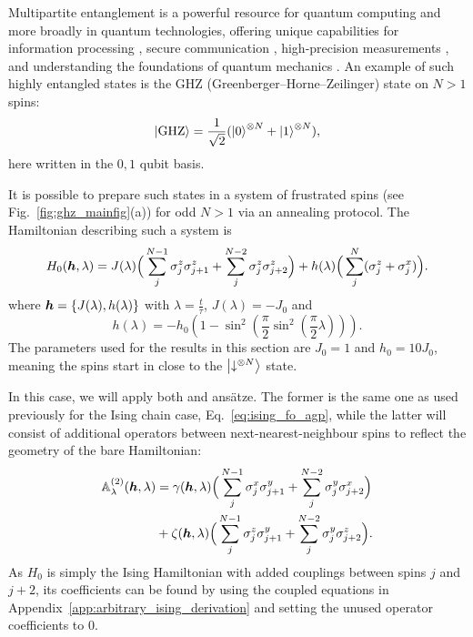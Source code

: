 Multipartite entanglement is a powerful resource for quantum computing and more broadly in quantum technologies, offering unique capabilities for information processing \cite{nielsen_quantum_2010}, secure communication \cite{bostrom_deterministic_2002}, high-precision measurements \cite{kim_heisenberg-limited_2022}, and understanding the foundations of quantum mechanics \cite{einstein_can_1935}. An example of such highly entangled states is the GHZ (Greenberger–Horne–Zeilinger) state \cite{greenberger_bells_1990} on $N > 1$ spins:
\begin{equation}\label{eq:GHZ_state}
    \ket{\rm GHZ} = \frac{1}{\sqrt{2}} (\ket{0}^{\otimes N} + \ket{1}^{\otimes N}),
\end{equation}
here written in the $0,1$ qubit basis.

It is possible to prepare such states in a system of frustrated spins (see Fig.~\ref{fig:ghz_mainfig}(a)) for odd $N > 1$ via an annealing protocol. The Hamiltonian describing such a system is
\begin{equation}\label{eq:ghz_hamiltonian}
    H_0(\boldsymbol{h}, \lambda) = J(\lambda) \Big( \sum_{j}^{N-1} \sigma^z_j \sigma^z_{j+1} + \sum_{j}^{N-2} \sigma^z_j \sigma^z_{j+2} \Big) + h(\lambda) \Big( \sum_j^N (\sigma^z_j + \sigma^x_j) \Big).
\end{equation}
where $\boldsymbol{h} = \{ J(\lambda), h(\lambda) \}$ with $\lambda = \frac{t}{\tau}$, $J(\lambda)= - J_0$ and
\begin{equation}
    h(\lambda) = - h_0 \left(1 - \sin^2\left(\frac{\pi}{2} \sin^2 \left( \frac{\pi}{2} \lambda \right) \right)\right).
\end{equation}
The parameters used for the results in this section are $J_0 = 1$ and $h_0 = 10J_0$, meaning the spins start in close to the $\ket{\downarrow^{\otimes N}}$ state. 

In this case, we will apply both   and   ans\"{a}tze. The former is the same one as used previously for the Ising chain case, Eq.~\eqref{eq:ising_fo_agp}, while the latter will consist of additional operators between next-nearest-neighbour spins to reflect the geometry of the bare Hamiltonian:
\begin{equation}\label{eq:ghz_so_lcd}
    \begin{aligned}
        \mathbb{A}_{\lambda}^{(2)}(\boldsymbol{h}, \lambda) &= \gamma(\boldsymbol{h}, \lambda) \Big( \sum_{j}^{N-1} \sigma^x_j \sigma^y_{j+1} + \sum_{j}^{N-2} \sigma^y_j \sigma^x_{j+2} \Big) \\
        &+ \zeta(\boldsymbol{h}, \lambda) \Big( \sum_{j}^{N-1} \sigma^z_j \sigma^y_{j+1} + \sum_{j}^{N-2} \sigma^y_j \sigma^z_{j+2} \Big).
    \end{aligned}
\end{equation}
As $H_0$ is simply the Ising Hamiltonian with added couplings between spins $j$ and $j+2$, its  coefficients can be found by using the coupled equations in Appendix~\ref{app:arbitrary_ising_derivation} and setting the unused operator coefficients to $0$. 

